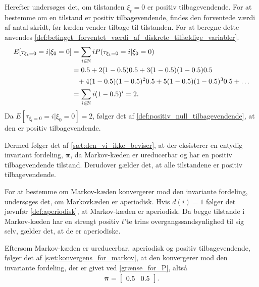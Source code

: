 Herefter undersøges det, om tilstanden $\xi_t = 0$ er positiv tilbagevendende. For at bestemme om en tilstand er positiv tilbagevendende, findes den forventede værdi af antal skridt, før kæden vender tilbage til tilstanden. For at beregne dette anvendes \autoref{def:betinget_forventet_værdi_af_diskrete_tilfældige_variabler}.
 \begin{align*}
     E[\tau_{\xi_{t} = 0}=i|\xi_0=0]&=\sum_{i\in \mathbb{N}} iP(\tau_{\xi_{t} = 0}=i|\xi_0=0)\\
     &=0.5+2(1-0.5)0.5+3(1-0.5)(1-0.5)0.5\\
     &\phantom{=} +4(1-0.5)(1-0.5)^20.5+5(1-0.5)(1-0.5)^30.5+\ldots\\
     &= \sum_{i \in \mathbb{N} } i(1-0.5)^{i} = 2.
 \end{align*}
Da $E[\tau_{\xi_{t} =0}=i|\xi_0=0]=2$, følger det af \autoref{def:positiv_null_tilbagevendende}, at den er positiv tilbagevendende.

Dermed følger det af \autoref{sæt:den_vi_ikke_beviser}, at der eksisterer en entydig invariant fordeling, $\bm \pi$, da Markov-kæden er ureducerbar og har en positiv tilbagevendende tilstand. Derudover gælder det, at alle tilstandene er positiv tilbagevendende.


For at bestemme om Markov-kæden konvergerer mod den invariante fordeling, undersøges det, om Markovkæden er aperiodisk. Hvis $d(i)=1$ følger det jævnfør \autoref{def:aperiodisk}, at Markov-kæden er aperiodisk. Da begge tilstande i Markov-kæden har en strengt positiv $t$'te trins overgangssandsynlighed til sig selv, gælder det, at de er aperiodiske. 

Eftersom Markov-kæden er ureducerbar, aperiodisk og positiv tilbagevendende, følger det af \autoref{sæt:konvergens_for_markov}, at den konvergerer mod den invariante fordeling, der er givet ved \eqref{grænse_for_P}, altså
\begin{align}
    \bm \pi = \begin{bmatrix} 0.5 & 0.5\end{bmatrix}.
\end{align}


